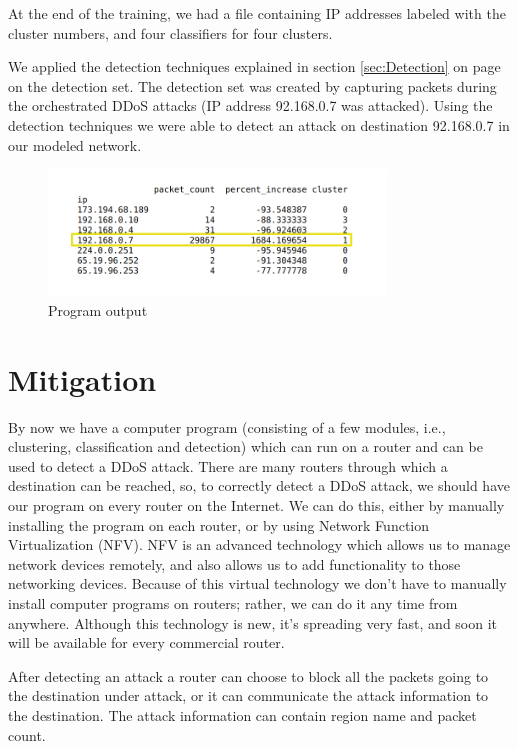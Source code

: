\documentclass[12pt,oneside,a4paper]{article}
\begin{document}
At the end of the training, we had a file containing IP addresses labeled with the cluster numbers, and four classifiers for four clusters.

We applied the detection techniques explained in section \ref{sec:Detection} on page \pageref{sec:Detection} on the detection set. The detection set was created by capturing packets during the orchestrated DDoS attacks (IP address 92.168.0.7 was attacked). Using the detection techniques we were able to detect an attack on destination 92.168.0.7 in our modeled network.

\begin{figure}[H]
\centering
\includegraphics[width=0.80\textwidth]{detected_IP.png}
\caption{Program output} \label{fig:detected_IP}
\end{figure}

\pagebreak
\section{Mitigation}

By now we have a computer program (consisting of a few modules, i.e., clustering, classification and detection) which can run on a router and can be used to detect a DDoS attack. There are many routers through which a destination can be reached, so, to correctly detect a DDoS attack, we should have our program on every router on the Internet. We can do this, either by manually installing the program on each router, or by using Network Function Virtualization (NFV)\cite{nfv}. NFV is an advanced technology which allows us to manage network devices remotely, and also allows us to add functionality to those networking devices. Because of this virtual technology we don't have to manually install computer programs on routers; rather, we can do it any time from anywhere. Although this technology is new, it's spreading very fast, and soon it will be available for every commercial router.

After detecting an attack a router can choose to block all the packets going to the destination under attack, or it can communicate the attack information to the destination. The attack information can contain region name and packet count.
\end{document}
